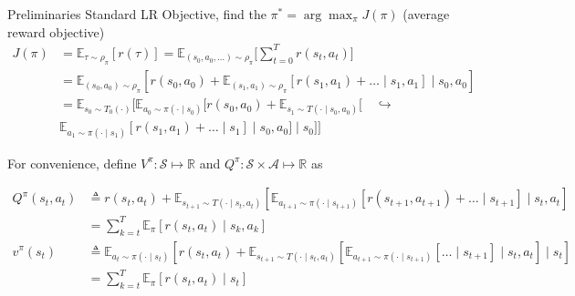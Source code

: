 \documentclass[8pt]{beamer}
\begin{document}
\begin{frame}{Preliminaries}
Standard LR Objective, find the $\pi^\ast = \arg \max_{\pi} J(\pi)$ (average reward objective)
\[
\begin{aligned}
    J(\pi) &= \mathbb{E}_{\tau \sim \rho_\pi}[r(\tau)] = \mathbb{E}_{(s_0, a_0, \dots) \sim \rho_\pi}\Biggl[\sum_{t=0}^T r(s_t, a_t)\Biggr] \\
    &= \mathbb{E}_{(s_0, a_0) \sim \rho_\pi}[r(s_0, a_0) + \mathbb{E}_{(s_1,a_1) \sim \rho_\pi}[r(s_1,a_1) + \dots \mid s_1, a_1]\mid s_0, a_0] \\
    &= \mathbb{E}_{s_0 \sim T_0(\cdot)}[\mathbb{E}_{a_0 \sim \pi(\cdot \mid s_0)}[r(s_0, a_0) + \mathbb{E}_{s_1 \sim T(\cdot \mid s_0, a_0)}[\quad \hookrightarrow \\ &\mathbb{E}_{a_1 \sim \pi(\cdot \mid s_1)}[r(s_1,a_1) + \dots \mid s_1]\mid s_0, a_0]\mid s_0]]
\end{aligned}
\]

For convenience, define $V^\pi: \mathcal{S} \mapsto \mathbb{R}$ and $Q^\pi: \mathcal{S} \times \mathcal{A} \mapsto \mathbb{R}$ as


\[
\begin{aligned}
Q^\pi(s_t, a_t) &\triangleq r(s_t, a_t) + \mathbb{E}_{s_{t+1}\sim T(\cdot \mid s_t, a_t)}[\mathbb{E}_{a_{t+1} \sim \pi(\cdot \mid s_{t+1})}[r(s_{t+1},a_{t+1})+ \dots \mid s_{t+1}]\mid s_t, a_t] \\
&= \sum_{k=t}^T \mathbb{E}_{\pi} [r(s_t, a_t) \mid s_k, a_k]  \\
v^\pi (s_t) &\triangleq \mathbb{E}_{a_t \sim \pi(\cdot \mid s_t)}[r(s_t,a_t) + \mathbb{E}_{s_{t+1} \sim T(\cdot \mid s_t, a_t)}[\mathbb{E}_{a_{t+1}\sim \pi(\cdot \mid s_{t+1})}[\dots \mid s_{t+1}] \mid s_t, a_t] \mid s_t] \\
 &=\sum_{k=t}^T \mathbb{E}_{\pi} [r(s_t, a_t) \mid s_t] 
\end{aligned}
\]
\end{frame}
\end{document}
